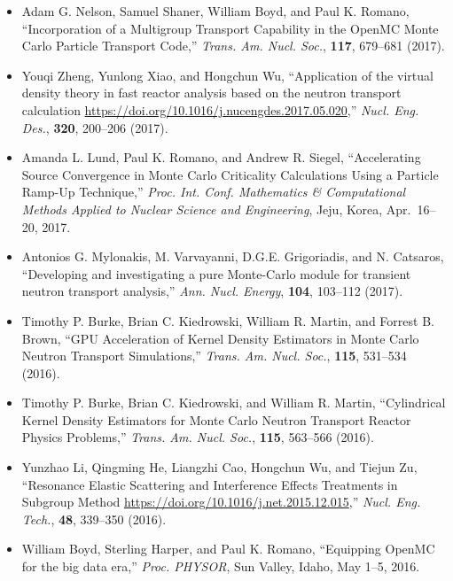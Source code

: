 \begin{itemize}
\item Adam G. Nelson, Samuel Shaner, William Boyd, and Paul K. Romano,
``Incorporation of a Multigroup Transport Capability in the OpenMC Monte Carlo
Particle Transport Code,'' \textit{Trans. Am. Nucl. Soc.}, \textbf{117}, 679--681 (2017).

\item Youqi Zheng, Yunlong Xiao, and Hongchun Wu, ``Application of the virtual
density theory in fast reactor analysis based on the neutron transport
calculation \url{https://doi.org/10.1016/j.nucengdes.2017.05.020},''
\textit{Nucl. Eng. Des.}, \textbf{320}, 200--206 (2017).

\item Amanda L. Lund, Paul K. Romano, and Andrew R. Siegel, ``Accelerating Source
Convergence in Monte Carlo Criticality Calculations Using a Particle Ramp-Up
Technique,'' \textit{Proc. Int. Conf. Mathematics \& Computational Methods Applied to
Nuclear Science and Engineering}, Jeju, Korea, Apr.\ 16--20, 2017.

\item Antonios G. Mylonakis, M. Varvayanni, D.G.E. Grigoriadis, and N. Catsaros,
``Developing and investigating a pure Monte-Carlo module for transient neutron
transport analysis,'' \textit{Ann. Nucl. Energy}, \textbf{104}, 103--112 (2017).

\item Timothy P. Burke, Brian C. Kiedrowski, William R. Martin, and
Forrest B. Brown, ``GPU Acceleration of Kernel Density Estimators in Monte
Carlo Neutron Transport Simulations,'' \textit{Trans. Am. Nucl. Soc.}, \textbf{115},
531--534 (2016).

\item Timothy P. Burke, Brian C. Kiedrowski, and William R. Martin, ``Cylindrical
Kernel Density Estimators for Monte Carlo Neutron Transport Reactor Physics
Problems,'' \textit{Trans. Am. Nucl. Soc.}, \textbf{115}, 563--566 (2016).

\item Yunzhao Li, Qingming He, Liangzhi Cao, Hongchun Wu, and Tiejun Zu, ``Resonance
Elastic Scattering and Interference Effects Treatments in Subgroup Method
\url{https://doi.org/10.1016/j.net.2015.12.015},'' \textit{Nucl. Eng. Tech.}, \textbf{48},
339--350 (2016).

\item William Boyd, Sterling Harper, and Paul K. Romano, ``Equipping OpenMC for the
big data era,'' \textit{Proc. PHYSOR}, Sun Valley, Idaho, May 1--5, 2016.


\end{itemize}
